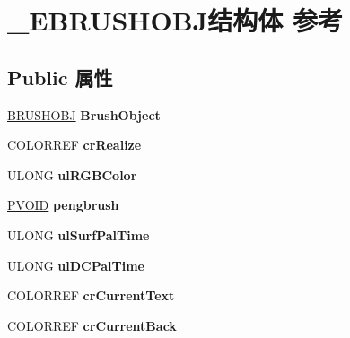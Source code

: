 \hypertarget{struct___e_b_r_u_s_h_o_b_j}{}\section{\+\_\+\+E\+B\+R\+U\+S\+H\+O\+B\+J结构体 参考}
\label{struct___e_b_r_u_s_h_o_b_j}
\subsection*{Public 属性}
\begin{DoxyCompactItemize}
\item 
\mbox{\label{struct___e_b_r_u_s_h_o_b_j_a832c69095274bdac4cde51447c436f98}} 
\hyperlink{struct___b_r_u_s_h_o_b_j}{B\+R\+U\+S\+H\+O\+BJ} {\bfseries Brush\+Object}
\item 
\mbox{\label{struct___e_b_r_u_s_h_o_b_j_a8f3cf600850e88e72f702905a47a22ae}} 
C\+O\+L\+O\+R\+R\+EF {\bfseries cr\+Realize}
\item 
\mbox{\label{struct___e_b_r_u_s_h_o_b_j_a3de21800624aedbff6b0a1d8a3a4d943}} 
U\+L\+O\+NG {\bfseries ul\+R\+G\+B\+Color}
\item 
\mbox{\label{struct___e_b_r_u_s_h_o_b_j_a6d0017c4e57e49cdd9285f298be24734}} 
\hyperlink{interfacevoid}{P\+V\+O\+ID} {\bfseries pengbrush}
\item 
\mbox{\label{struct___e_b_r_u_s_h_o_b_j_a37ddebe1d64c41430ef28750461a3e26}} 
U\+L\+O\+NG {\bfseries ul\+Surf\+Pal\+Time}
\item 
\mbox{\label{struct___e_b_r_u_s_h_o_b_j_ae41d9e6e81c8524989902aefa28a6333}} 
U\+L\+O\+NG {\bfseries ul\+D\+C\+Pal\+Time}
\item 
\mbox{\label{struct___e_b_r_u_s_h_o_b_j_a2c1c98a0d0021cc6c02833bbd1df3878}} 
C\+O\+L\+O\+R\+R\+EF {\bfseries cr\+Current\+Text}
\item 
\mbox{\label{struct___e_b_r_u_s_h_o_b_j_af7f675d57ba47fd917fea48e6c71bb75}} 
C\+O\+L\+O\+R\+R\+EF {\bfseries cr\+Current\+Back}

\end{DoxyCompactItemize}
